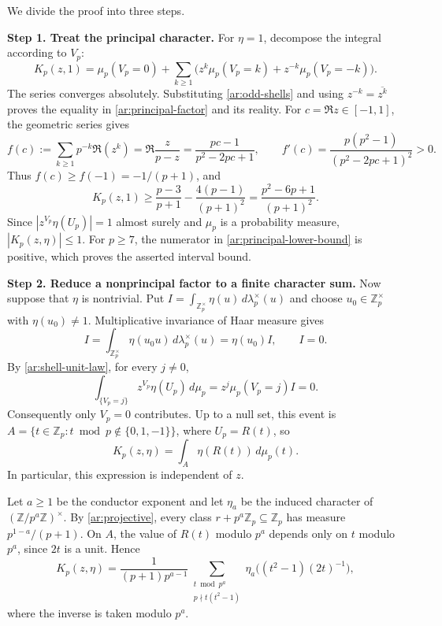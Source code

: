 \documentclass[twoside]{aomart}
\makeatletter
\theoremstyle{paperplain}
\theoremstyle{paperdefinition}
\renewenvironment{proof}[1][\proofname]{\par\pushQED{\qed}%
  \normalfont\topsep6\p@\@plus3\p@\relax\trivlist
  \item[\hskip\labelsep\itshape #1\@addpunct{.}]\ignorespaces
}{\popQED\endtrivlist\@endpefalse}
\newcommand{\Z}{\mathbb Z}
\numberwithin{equation}{section}
\makeatother
\begin{document}
\begin{proof}
We divide the proof into three steps.
\par
\medskip
\noindent\textbf{Step 1. Treat the principal character.}
For $\eta=1$, decompose the integral according to $V_p$:
\begin{equation*}
 K_p(z,1)=\mu_p(V_p=0)
 +\sum_{k\ge1}\bigl(z^k\mu_p(V_p=k)+z^{-k}\mu_p(V_p=-k)\bigr).
\end{equation*}
The series converges absolutely. Substituting
\eqref{ar:odd-shells} and using $z^{-k}=\overline{z^k}$ proves
the equality in \eqref{ar:principal-factor} and its reality.
For $c=\Re z\in[-1,1]$, the geometric series gives
\begin{equation*}
 f(c):=\sum_{k\ge1}p^{-k}\Re(z^k)=\Re\frac z{p-z}=\frac{pc-1}{p^2-2pc+1},\qquad f'(c)=\frac{p(p^2-1)}{(p^2-2pc+1)^2}>0.
\end{equation*}
Thus $f(c)\ge f(-1)=-1/(p+1)$, and
\begin{equation}
 K_p(z,1)\ge\frac{p-3}{p+1}-\frac{4(p-1)}{(p+1)^2}
 =\frac{p^2-6p+1}{(p+1)^2}.
 \label{ar:principal-lower-bound}
\end{equation}
Since $|z^{V_p}\eta(U_p)|=1$ almost surely and $\mu_p$ is a
probability measure, $|K_p(z,\eta)|\le1$. For $p\ge7$, the
numerator in \eqref{ar:principal-lower-bound} is positive,
which proves the asserted interval bound.

\par
\medskip
\noindent\textbf{Step 2. Reduce a nonprincipal factor to a finite character sum.}
Now suppose that $\eta$ is nontrivial. Put
$I=\int_{\Z_p^\times}\eta(u)\,d\lambda_p^\times(u)$ and choose
$u_0\in\Z_p^\times$ with $\eta(u_0)\ne1$.
Multiplicative invariance of Haar measure gives
\begin{equation*}
 I=\int_{\Z_p^\times}\eta(u_0u)\,d\lambda_p^\times(u)
   =\eta(u_0)I,\qquad I=0.
\end{equation*}
By \eqref{ar:shell-unit-law}, for every $j\ne0$,
\begin{equation*}
 \int_{\{V_p=j\}}z^{V_p}\eta(U_p)\,d\mu_p
 =z^j\mu_p(V_p=j)I=0.
\end{equation*}
Consequently only $V_p=0$ contributes. Up to a null set, this event is
$A=\{t\in\Z_p:t\bmod p\notin\{0,1,-1\}\}$, where $U_p=R(t)$,
so
\begin{equation*}
 K_p(z,\eta)=\int_A\eta(R(t))\,d\mu_p(t).
\end{equation*}
In particular, this expression is independent of $z$.

Let $a\ge1$ be the conductor exponent and let $\eta_a$ be the
induced character of $(\Z/p^a\Z)^\times$. By
\eqref{ar:projective}, every class $r+p^a\Z_p\subseteq\Z_p$
has measure $p^{1-a}/(p+1)$. On $A$, the value of $R(t)$ modulo
$p^a$ depends only on $t$ modulo $p^a$, since $2t$ is a unit.
Hence
\begin{equation}
 K_p(z,\eta)=\frac1{(p+1)p^{a-1}}
 \sum_{\substack{t\bmod p^a\\p\nmid t(t^2-1)}}
 \eta_a\bigl((t^2-1)(2t)^{-1}\bigr),
 \label{ar:finite-conductor-factor}
\end{equation}
where the inverse is taken modulo $p^a$.


\end{proof}
\end{document}
